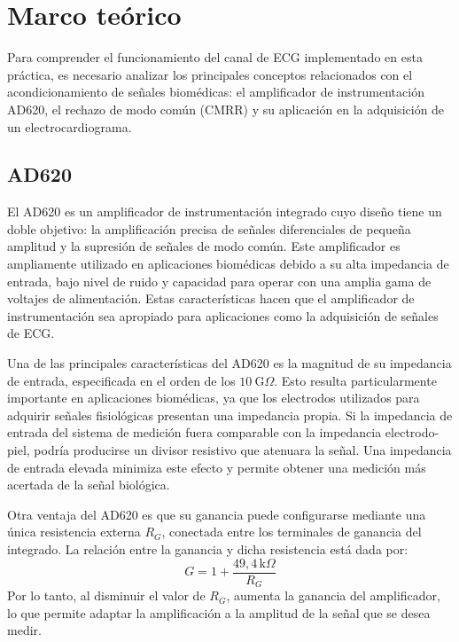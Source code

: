 \section{Marco teórico}
Para comprender el funcionamiento del canal de ECG implementado en esta práctica, es necesario analizar los principales conceptos relacionados con el acondicionamiento de señales biomédicas: el amplificador de instrumentación AD620, el rechazo de modo común (CMRR) y su aplicación en la adquisición de un electrocardiograma.

\subsection{AD620}
El AD620 es un amplificador de instrumentación integrado cuyo diseño tiene un doble objetivo: la amplificación precisa de señales diferenciales de pequeña amplitud y la supresión de señales de modo común. 
Este amplificador es ampliamente utilizado en aplicaciones biomédicas debido a su alta impedancia de entrada, bajo nivel de ruido y capacidad para operar con una amplia gama de voltajes de alimentación.
Estas características hacen que el amplificador de instrumentación sea apropiado para aplicaciones como la adquisición de señales de ECG.

Una de las principales características del AD620 es la magnitud de su impedancia de entrada, especificada en el orden de los $10~\mathrm{G}\Omega$.
 Esto resulta particularmente importante en aplicaciones biomédicas, ya que los electrodos utilizados para adquirir señales fisiológicas presentan una impedancia propia.
 Si la impedancia de entrada del sistema de medición fuera comparable con la impedancia electrodo-piel, podría producirse un divisor resistivo que atenuara la señal.
 Una impedancia de entrada elevada minimiza este efecto y permite obtener una medición más acertada de la señal biológica.
 
Otra ventaja del AD620 es que su ganancia puede configurarse mediante una única resistencia externa $R_G$, conectada entre los terminales de ganancia del integrado.
La relación entre la ganancia y dicha resistencia está dada por:
\begin{equation}
G = 1 + \frac{49{,}4\,\mathrm{k}\Omega}{R_G}
\end{equation}
 Por lo tanto, al disminuir el valor de $R_G$, aumenta la ganancia del amplificador, lo que permite adaptar la amplificación a la amplitud de la señal que se desea medir.

